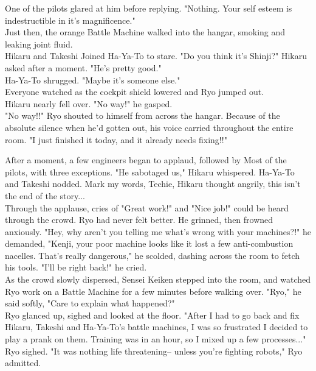 \documentclass[11pt,twoside,a4paper]{book}
\begin{document}
\begin{multicols*}{2}
One of the pilots glared at him before replying. "Nothing. Your self esteem is indestructible in it's magnificence." ~\\

Just then, the orange Battle Machine walked into the hangar, smoking and leaking joint fluid. ~\\

Hikaru and Takeshi Joined Ha-Ya-To to stare. "Do you think it's Shinji?" Hikaru asked after a moment. "He's pretty good." ~\\

Ha-Ya-To shrugged. "Maybe it's someone else." ~\\

Everyone watched as the cockpit shield lowered and Ryo jumped out. ~\\

Hikaru nearly fell over. "No way!" he gasped. ~\\

"No way!!" Ryo shouted to himself from across the hangar. Because of the absolute silence when he'd gotten out, his voice carried throughout the entire room. "I just finished it today, and it already needs fixing!!" ~\\

\vfill
\columnbreak

After a moment, a few engineers began to applaud, followed by Most of the pilots, with three exceptions. "He sabotaged us," Hikaru whispered. Ha-Ya-To and Takeshi nodded. Mark my words, Techie, Hikaru thought angrily, this isn't the end of the story... ~\\

Through the applause, cries of "Great work!" and "Nice job!" could be heard through the crowd. Ryo had never felt better. He grinned, then frowned anxiously. "Hey, why aren't you telling me what's wrong with your machines?!" he demanded, "Kenji, your poor machine looks like it lost a few anti-combustion nacelles. That's really dangerous," he scolded, dashing across the room to fetch his tools. "I'll be right back!" he cried. ~\\

As the crowd slowly dispersed, Sensei Keiken stepped into the room, and watched Ryo work on a Battle Machine for a few minutes before walking over. "Ryo," he said softly, "Care to explain what happened?" ~\\

Ryo glanced up, sighed and looked at the floor. "After I had to go back and fix Hikaru, Takeshi and Ha-Ya-To's battle machines, I was so frustrated I decided to play a prank on them. Training was in an hour, so I mixed up a few processes..." Ryo sighed. "It was nothing life threatening-- unless you're fighting robots," Ryo admitted. ~\\


\end{multicols*}
\end{document}
